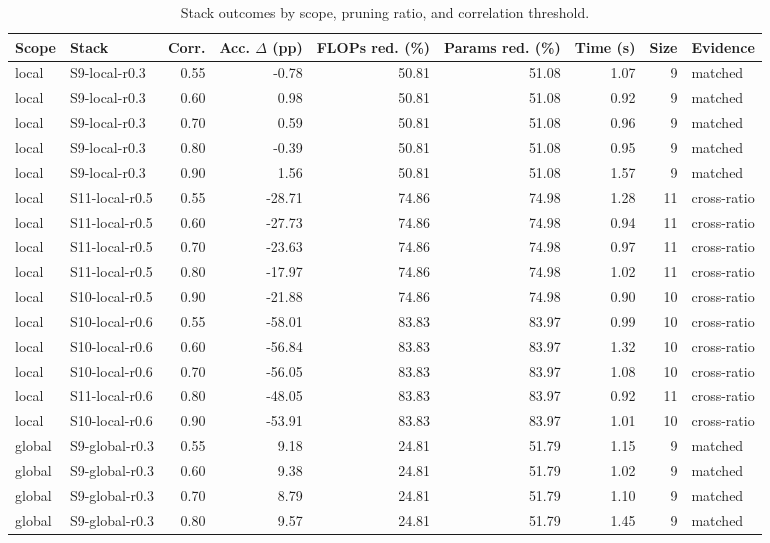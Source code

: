 \documentclass[11pt]{article}
\begin{document}
\begin{longtable}{llrrrrrrl}\caption{Stack outcomes by scope, pruning ratio, and correlation threshold.}\label{tab:conditions}\\ \toprule Scope & Stack & Corr. & Acc. $\Delta$ (pp) & FLOPs red. (\%) & Params red. (\%) & Time (s) & Size & Evidence \\ \midrule
local & S9-local-r0.3 & 0.55 & -0.78 & 50.81 & 51.08 & 1.07 & 9 & matched \\
local & S9-local-r0.3 & 0.60 & 0.98 & 50.81 & 51.08 & 0.92 & 9 & matched \\
local & S9-local-r0.3 & 0.70 & 0.59 & 50.81 & 51.08 & 0.96 & 9 & matched \\
local & S9-local-r0.3 & 0.80 & -0.39 & 50.81 & 51.08 & 0.95 & 9 & matched \\
local & S9-local-r0.3 & 0.90 & 1.56 & 50.81 & 51.08 & 1.57 & 9 & matched \\
local & S11-local-r0.5 & 0.55 & -28.71 & 74.86 & 74.98 & 1.28 & 11 & cross-ratio \\
local & S11-local-r0.5 & 0.60 & -27.73 & 74.86 & 74.98 & 0.94 & 11 & cross-ratio \\
local & S11-local-r0.5 & 0.70 & -23.63 & 74.86 & 74.98 & 0.97 & 11 & cross-ratio \\
local & S11-local-r0.5 & 0.80 & -17.97 & 74.86 & 74.98 & 1.02 & 11 & cross-ratio \\
local & S10-local-r0.5 & 0.90 & -21.88 & 74.86 & 74.98 & 0.90 & 10 & cross-ratio \\
local & S10-local-r0.6 & 0.55 & -58.01 & 83.83 & 83.97 & 0.99 & 10 & cross-ratio \\
local & S10-local-r0.6 & 0.60 & -56.84 & 83.83 & 83.97 & 1.32 & 10 & cross-ratio \\
local & S10-local-r0.6 & 0.70 & -56.05 & 83.83 & 83.97 & 1.08 & 10 & cross-ratio \\
local & S11-local-r0.6 & 0.80 & -48.05 & 83.83 & 83.97 & 0.92 & 11 & cross-ratio \\
local & S10-local-r0.6 & 0.90 & -53.91 & 83.83 & 83.97 & 1.01 & 10 & cross-ratio \\
global & S9-global-r0.3 & 0.55 & 9.18 & 24.81 & 51.79 & 1.15 & 9 & matched \\
global & S9-global-r0.3 & 0.60 & 9.38 & 24.81 & 51.79 & 1.02 & 9 & matched \\
global & S9-global-r0.3 & 0.70 & 8.79 & 24.81 & 51.79 & 1.10 & 9 & matched \\
global & S9-global-r0.3 & 0.80 & 9.57 & 24.81 & 51.79 & 1.45 & 9 & matched \\

\end{longtable}
\end{document}

